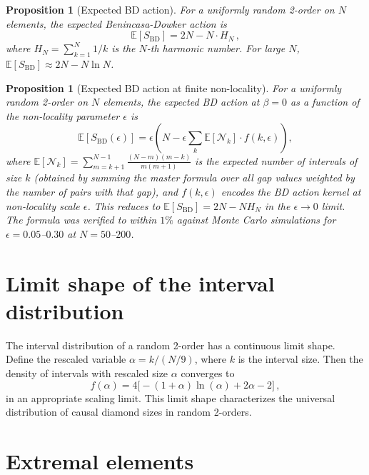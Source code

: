 \documentclass[aps,prd,twocolumn,superscriptaddress,nofootinbib]{revtex4-2}
\newtheorem{proposition}[theorem]{Proposition}
\begin{document}
\begin{proposition}[Expected BD action]
\label{prop:bd_action}
For a uniformly random 2-order on $N$ elements, the expected Benincasa-Dowker action is
\begin{equation}
\mathbb{E}[S_{\mathrm{BD}}] = 2N - N \cdot H_N\,,
\end{equation}
where $H_N = \sum_{k=1}^{N} 1/k$ is the $N$-th harmonic number. For large $N$, $\mathbb{E}[S_{\mathrm{BD}}] \approx 2N - N \ln N$.
\end{proposition}

\begin{proposition}[Expected BD action at finite non-locality]
\label{prop:bd_epsilon}
For a uniformly random 2-order on $N$ elements, the expected BD action at $\beta = 0$ as a function of the non-locality parameter $\epsilon$ is
\begin{equation}
\mathbb{E}[S_{\mathrm{BD}}(\epsilon)] = \epsilon \left( N - \epsilon \sum_k \mathbb{E}[\mathcal{N}_k] \cdot f(k, \epsilon) \right),
\end{equation}
where $\mathbb{E}[\mathcal{N}_k] = \sum_{m=k+1}^{N-1} \frac{(N-m)(m-k)}{m(m+1)}$ is the expected number of intervals of size $k$ (obtained by summing the master formula over all gap values weighted by the number of pairs with that gap), and $f(k,\epsilon)$ encodes the BD action kernel at non-locality scale $\epsilon$. This reduces to $\mathbb{E}[S_{\mathrm{BD}}] = 2N - N H_N$ in the $\epsilon \to 0$ limit. The formula was verified to within $1\%$ against Monte Carlo simulations for $\epsilon = 0.05$--$0.30$ at $N = 50$--$200$.
\end{proposition}

\section{Limit shape of the interval distribution}

The interval distribution of a random 2-order has a continuous limit shape. Define the rescaled variable $\alpha = k / (N/9)$, where $k$ is the interval size. Then the density of intervals with rescaled size $\alpha$ converges to
\begin{equation}
f(\alpha) = 4\bigl[-(1 + \alpha)\ln(\alpha) + 2\alpha - 2\bigr]\,,
\end{equation}
in an appropriate scaling limit. This limit shape characterizes the universal distribution of causal diamond sizes in random 2-orders.

\section{Extremal elements}
\end{document}
